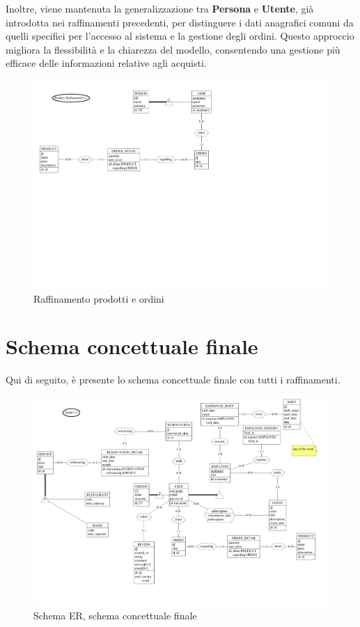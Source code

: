 \documentclass[a4paper,12pt]{report}
\begin{document}
\vspace{\baselineskip}
Inoltre, viene mantenuta la generalizzazione tra \textbf{Persona} e
\textbf{Utente}, già introdotta nei raffinamenti precedenti, per
distinguere i dati anagrafici comuni da quelli specifici per
l'accesso al sistema e la gestione degli ordini. Questo approccio
migliora la flessibilità e la chiarezza del modello, consentendo una
gestione più efficace delle informazioni relative agli acquisti.

\begin{figure}[H]
  \centering
  \includegraphics[width=\textwidth, trim=0 300pt 325pt 0,
  clip]{./schemas/refinements/product.pdf}
  \caption{Raffinamento prodotti e ordini}
  \label{fig:raffinamento-prodotto-ordini}
\end{figure}

\newpage
\section{Schema concettuale finale}
Qui di seguito, è presente lo schema concettuale finale con tutti i
raffinamenti.

\begin{figure}[H]
  \centering
  \includegraphics[width=\textwidth, trim=0 0 0
  0]{./schemas/refinements/final.pdf}
  \caption{Schema ER, schema concettuale finale}
  \label{fig:schema-finale}
\end{figure}
\end{document}
